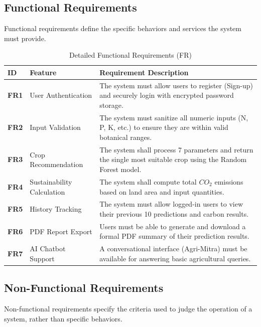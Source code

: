 \documentclass[12pt,a4paper]{report}
\begin{document}
\subsection{Functional Requirements}
Functional requirements define the specific behaviors and services the system must provide.

\begin{table}[H]
    \centering
    \renewcommand{\arraystretch}{1.5}
    \begin{tabularx}{\textwidth}{|l|p{4cm}|X|}
        \hline
        \textbf{ID} & \textbf{Feature} & \textbf{Requirement Description} \\
        \hline
        \textbf{FR1} & User Authentication & The system must allow users to register (Sign-up) and securely login with encrypted password storage. \\
        \hline
        \textbf{FR2} & Input Validation & The system must sanitize all numeric inputs (N, P, K, etc.) to ensure they are within valid botanical ranges. \\
        \hline
        \textbf{FR3} & Crop Recommendation & The system shall process 7 parameters and return the single most suitable crop using the Random Forest model. \\
        \hline
        \textbf{FR4} & Sustainability Calculation & The system shall compute total $CO_2$ emissions based on land area and input quantities. \\
        \hline
        \textbf{FR5} & History Tracking & The system must allow logged-in users to view their previous 10 predictions and carbon results. \\
        \hline
        \textbf{FR6} & PDF Report Export & Users must be able to generate and download a formal PDF summary of their prediction results. \\
        \hline
        \textbf{FR7} & AI Chatbot Support & A conversational interface (Agri-Mitra) must be available for answering basic agricultural queries. \\
        \hline
    \end{tabularx}
    \caption{Detailed Functional Requirements (FR)}
\end{table}

\subsection{Non-Functional Requirements}
Non-functional requirements specify the criteria used to judge the operation of a system, rather than specific behaviors.
\end{document}
